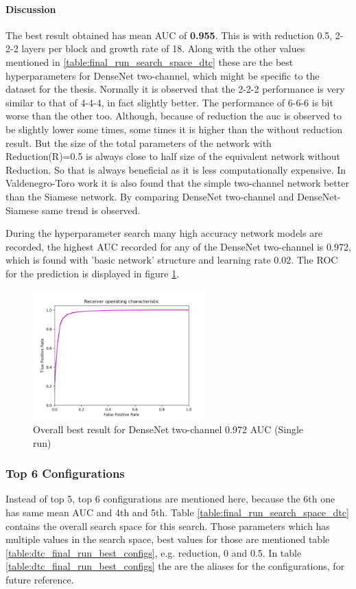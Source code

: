 \paragraph{Discussion\\}
The best result obtained has mean AUC of \textbf{0.955}. This is with reduction 0.5, 2-2-2 layers per block and growth rate of 18. Along with the other values mentioned in \ref{table:final_run_search_space_dtc} these are the best
hyperparameters for DenseNet two-channel, which might be specific to the dataset for the thesis. Normally it is observed that the 2-2-2 performance
is very similar to that of 4-4-4, in fact slightly better. The performance of 6-6-6 is bit worse than the other too. 
Although, because of reduction the auc is observed to be slightly lower some times, some times it is higher than the without reduction result. But the size of the total parameters 
of the network with Reduction(R)=0.5 is always close to half size of the equivalent network without Reduction. So that is always beneficial as it is less computationally expensive.
In Valdenegro-Toro \cite{stateoftheart} work it is also found that the simple two-channel network better than the Siamese network. By comparing DenseNet two-channel and DenseNet-Siamese same trend is observed.

During the hyperparameter search many high accuracy network models are recorded, the highest AUC recorded for any of the DenseNet two-channel is 0.972, which is found with 'basic network' structure and learning rate 0.02. 
The ROC for the prediction is displayed in figure \ref{fig:densenet_two_channel_ninetysevenAUC}.
\begin{figure}[ht]
\centering
\includegraphics[height= 5cm]{images/densenet/densenet_two_channel_ninetysevenAUC}
\caption{Overall best result for DenseNet two-channel 0.972 AUC (Single run)}
\label{fig:densenet_two_channel_ninetysevenAUC}
\end{figure}

\subsubsection{Top 6 Configurations}
Instead of top 5, top 6 configurations are mentioned here, because the 6th one has same mean AUC and 4th and 5th. Table \ref{table:final_run_search_space_dtc} contains the overall search space for this search. Those parameters which has 
multiple values in the search space, best values for those are mentioned table \ref{table:dtc_final_run_best_configs}, e.g. reduction, 0 and 0.5.
In table \ref{table:dtc_final_run_best_configs} the  are the aliases for the configurations, for future reference.

